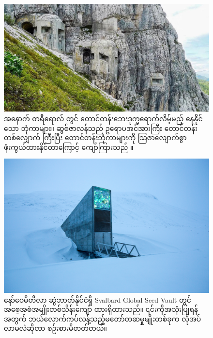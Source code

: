 \documentclass[10pt,twocolumn,letterpaper]{article}
\begin{document}
\begin{figure}[t]
\begin{center}

\includegraphics[width=1\linewidth]{tyrol.jpg}
\end{center}
   \caption{အနောက် တရီရောလ် တွင် တောင်တန်းဘေးဒုက္ခရောက်လိမ့်မည့် နေနိုင်သော ဘုံကာများ။ ဆွစ်ဇာလန်သည် ဥရောပအင်အားကြီး တောင်တန်းတစ်လျှောက် ကြီးပြီး တောင်တန်းဘုံကာများကို သြဇာလျောက်စွာ ဖုံးကွယ်ထားနိုင်တာကြောင့် ကျော်ကြားသည် \cite{32}။}
\label{fig:7}
\label{fig:onecol}
\end{figure}

\begin{figure}[t]
\begin{center}
\includegraphics[width=1\linewidth]{svalbard.jpg}
\end{center}
   \caption{နော်ဝေမိတီလာ ဆွဲဘာတ်နိုင်ငံရှိ Svalbard Global Seed Vault တွင် အစေ့အစံအမျိုးတစ်သိန်းကျော် ထားရှိထားသည်။ \cite{24} ၎င်းကိုအသုံးပြုရန်အတွက် ဘယ်လောက်ကပ်လန့်သည့်မတော်တဆမှုမျိုးတစ်ခုက လိုအပ်လာမလဲဆိုတာ စဉ်းစားမိတတ်တယ်။}
\label{fig:8}
\label{fig:onecol}
\end{figure}
\end{document}
